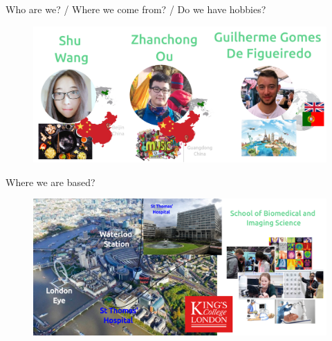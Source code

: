
{
\begin{frame}{Who are we? / Where we come from? / Do we have hobbies?}

  \begin{figure}
  \centering
  \includegraphics[width=1.0\textwidth]{./../figures/team/who-we-are/versions/drawing-v09.png}
  \end{figure}

\end{frame}
}




{
\begin{frame}{Where we are based?}

  \begin{figure}
  \centering
  \includegraphics[width=1.0\textwidth]{./../figures/where-we-are-based/versions/drawing-v04.png}
  \end{figure}

\end{frame}
}





